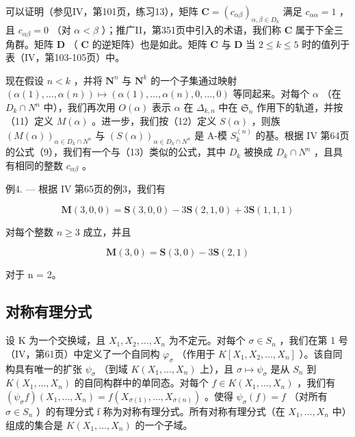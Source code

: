 可以证明（参见IV，第101页，练习13），矩阵 \(\mathbf{C} = (c_{\alpha \beta})_{\alpha, \beta \in D_k}\) 满足 \(c_{\alpha \alpha} = 1\) ，且 \(c_{\alpha \beta} = 0\) （对 \(\alpha < \beta\) ）；推广II，第351页中引入的术语，我们称 \(\mathbf{C}\) 属于下全三角群。矩阵 \(\mathbf{D}\) （ \(\mathbf{C}\) 的逆矩阵）也是如此。矩阵 \(\mathbf{C}\) 与 \(\mathbf{D}\) 当 \(2 \leqslant k \leqslant 5\) 时的值列于表（IV，第103-105页）中。

现在假设 \(n < k\) ，并将 \(\mathbf{N}^n\) 与 \(\mathbf{N}^k\) 的一个子集通过映射 \((\alpha(1), \ldots, \alpha(n)) \mapsto (\alpha(1), \ldots, \alpha(n), 0, \ldots, 0)\) 等同起来。对每个 \(\alpha\) （在 \(D_k \cap N^n\) 中），我们再次用 \(O(\alpha)\) 表示 \(\alpha\) 在 \(\Delta_{k,n}\) 中在 \(\mathfrak{S}_n\) 作用下的轨道，并按（11）定义 \(M(\alpha)\) 。进一步，我们按（12）定义 \(S(\alpha)\) ，则族 \((M(\alpha))_{\alpha \in D_k \cap N^n}\) 与 \((S(\alpha))_{\alpha \in D_k \cap N^n}\) 是 A-模 \(S_k^{(n)}\) 的基。根据 IV 第64页的公式（9），我们有一个与（13）类似的公式，其中 \(D_k\) 被换成 \(D_k \cap N^n\) ，且具有相同的整数 \(c_{\alpha\beta}\) 。

例4. --- 根据 IV 第65页的例3，我们有

\[
\mathbf {M} (3, 0, 0) = \mathbf {S} (3, 0, 0) - 3 \mathbf {S} (2, 1, 0) + 3 \mathbf {S} (1, 1, 1)
\]

对每个整数 \(n \geqslant 3\) 成立，并且

\[
\mathbf {M} (3, 0) = \mathbf {S} (3, 0) - 3 \mathbf {S} (2, 1)
\]

对于 n = 2。

\subsection{对称有理分式}

设 K 为一个交换域，且 \(X_{1}, X_{2}, \ldots, X_{n}\) 为不定元。对每个 \(\sigma \in S_{n}\) ，我们在第 1 号（IV，第61页）中定义了一个自同构 \(\varphi_{\sigma}\) （作用于 \(K[X_{1}, X_{2}, \ldots, X_{n}]\) ）。该自同构具有唯一的扩张 \(\psi_{\sigma}\) （到域 \(K(X_{1}, \ldots, X_{n})\) 上），且 \(\sigma \mapsto \psi_{\sigma}\) 是从 \(S_{n}\) 到 \(K(X_{1}, \ldots, X_{n})\) 的自同构群中的单同态。对每个 \(f \in K(X_{1}, \ldots, X_{n})\) ，我们有 \((\psi_{\sigma} f) (X_{1}, \ldots, X_{n}) = f(X_{\sigma(1)}, \ldots, X_{\sigma(n)})\) 。使得 \(\psi_{\sigma}(f) = f\) （对所有 \(\sigma \in S_{n}\) ）的有理分式 f 称为对称有理分式。所有对称有理分式（在 \(X_{1}, \ldots, X_{n}\) 中）组成的集合是 \(K(X_{1}, \ldots, X_{n})\) 的一个子域。

